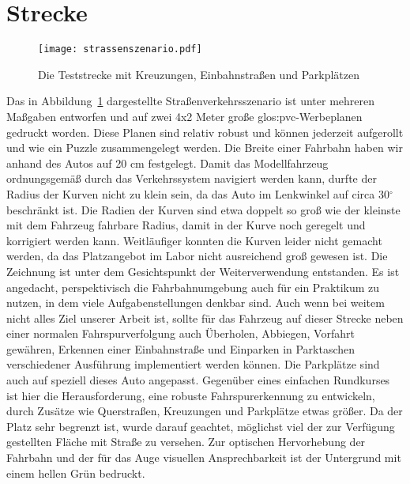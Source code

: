 \section{Strecke}

\begin{figure}[H] %
  \centering
  \texttt{[image: strassenszenario.pdf]}
  \caption{Die Teststrecke mit Kreuzungen, Einbahnstraßen und Parkplätzen}
  \label{fig:strassenszenario}
\end{figure}

Das in Abbildung~\ref{fig:strassenszenario} dargestellte Straßenverkehrsszenario ist unter mehreren Maßgaben entworfen und auf zwei 4x2 Meter große \gls{glos:pvc}-Werbeplanen gedruckt worden. Diese Planen sind relativ robust und können jederzeit aufgerollt und wie ein Puzzle zusammengelegt werden. Die Breite einer Fahrbahn haben wir anhand des Autos auf 20 cm festgelegt. Damit das Modellfahrzeug ordnungsgemäß durch das Verkehrssystem navigiert werden kann, durfte der Radius der Kurven nicht zu klein sein, da das Auto im Lenkwinkel auf circa 30\(^\circ\) beschränkt ist. Die Radien der Kurven sind etwa doppelt so groß wie der kleinste mit dem Fahrzeug fahrbare Radius, damit in der Kurve noch geregelt und korrigiert werden kann. Weitläufiger konnten die Kurven leider nicht gemacht werden, da das Platzangebot im Labor nicht ausreichend groß gewesen ist.
Die Zeichnung ist unter dem Gesichtspunkt der Weiterverwendung entstanden. Es ist angedacht, perspektivisch die Fahrbahnumgebung auch für ein Praktikum zu nutzen, in dem viele Aufgabenstellungen denkbar sind. Auch wenn bei weitem nicht alles Ziel unserer Arbeit ist, sollte für das Fahrzeug auf dieser Strecke neben einer normalen Fahrspurverfolgung auch Überholen, Abbiegen, Vorfahrt gewähren, Erkennen einer Einbahnstraße und Einparken in Parktaschen verschiedener Ausführung implementiert werden können. Die Parkplätze sind auch auf speziell dieses Auto angepasst. Gegenüber eines einfachen Rundkurses ist hier die Herausforderung, eine robuste Fahrspurerkennung zu entwickeln, durch Zusätze wie Querstraßen, Kreuzungen und Parkplätze etwas größer. Da der Platz sehr begrenzt ist, wurde darauf geachtet, möglichst viel der zur Verfügung gestellten Fläche mit Straße zu versehen. Zur optischen Hervorhebung der Fahrbahn und der für das Auge visuellen Ansprechbarkeit ist der Untergrund mit einem hellen Grün bedruckt.
